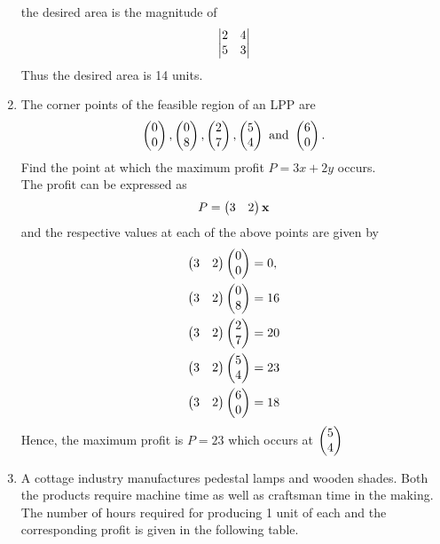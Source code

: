 \documentclass[journal,12pt,twocolumn]{IEEEtran}
\renewcommand\thesection{\arabic{section}}
\begin{document}
\begin{enumerate}[label=\thesection.\arabic*.,ref=\thesection.\theenumi]
    the desired area is  the magnitude of 
\begin{align}
 \begin{vmatrix}2 & 4\\5 & 3\end{vmatrix} 
    \end{align}
    Thus the desired area is 14 units.
\item  The corner points of the feasible region of an LPP are 
\begin{align}
	\begin{pmatrix}0\\0\end{pmatrix},\begin{pmatrix}0\\8\end{pmatrix},\begin{pmatrix}2\\7\end{pmatrix},\begin{pmatrix}5\\4\end{pmatrix} \text{ and } \begin{pmatrix}6\\0\end{pmatrix}. 
    \end{align}
	Find the point at which the maximum profit $P=3x+2y$ occurs. 
	\\
	\solution The profit can be expressed as
\begin{align}
	P=\begin{pmatrix}3  & 2\end{pmatrix} \mathbf{x}
    \end{align}
    and the respective values at each of the above points are given by 
\begin{align}
	\begin{pmatrix}3  & 2\end{pmatrix}\begin{pmatrix}0\\0\end{pmatrix} &= 0,
	\\
	\begin{pmatrix}3  & 2\end{pmatrix}\begin{pmatrix}0\\8\end{pmatrix} & = 16
	\\
	\begin{pmatrix}3  & 2\end{pmatrix}\begin{pmatrix}2\\7\end{pmatrix} &= 20
	\\
	\begin{pmatrix}3  & 2\end{pmatrix}\begin{pmatrix}5\\4\end{pmatrix} &= 23
	\\
	\begin{pmatrix}3  & 2\end{pmatrix} \begin{pmatrix}6\\0\end{pmatrix} &= 18 
    \end{align}
    Hence, the maximum profit is $P = 23$ which occurs at $\begin{pmatrix}5\\4\end{pmatrix}$
\item A cottage industry manufactures pedestal lamps and wooden shades. Both the products require machine time as well as craftsman time in the making. The number of hours required for producing 1 unit of each and the corresponding profit is given in the following table. 
	\begin{table}[!ht]
		\centering
{}
	\caption{}
	\label{table}
\end{table}


\end{enumerate}
\end{document}
